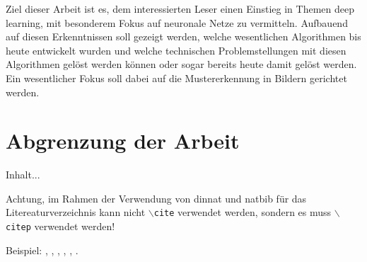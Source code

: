 Ziel dieser Arbeit ist es, dem interessierten Leser einen Einstieg in Themen deep learning, mit besonderem Fokus auf neuronale Netze zu vermitteln. Aufbauend auf diesen Erkenntnissen soll gezeigt werden, welche wesentlichen Algorithmen bis heute entwickelt wurden und welche technischen Problemstellungen mit diesen Algorithmen gelöst werden können oder sogar bereits heute damit gelöst werden. Ein wesentlicher Fokus soll dabei auf die Mustererkennung in Bildern gerichtet werden.

\section{Abgrenzung der Arbeit}
Inhalt...

Achtung, im Rahmen der Verwendung von dinnat und natbib für das Litereaturverzeichnis kann nicht \texttt{$\backslash$cite} verwendet werden, sondern es muss \texttt{$\backslash$citep} verwendet werden!

Beispiel: \citep{Blank2008}, \citep{DeutscheNationalBibliothek2009}, \citep{Ehgartner2004}, \citep{Farkas2007}, \citep{Hatcher2004}, \citep{Henze2006}.
